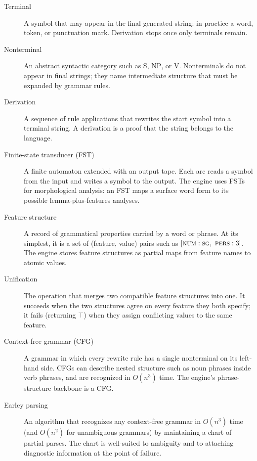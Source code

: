 \documentclass[11pt]{article}
\theoremstyle{definition}
\theoremstyle{plain}
\theoremstyle{remark}
\begin{document}
\begin{description}
  \item[Terminal] A symbol that may appear in the final generated string: in
  practice a word, token, or punctuation mark. Derivation stops once only
  terminals remain.

  \item[Nonterminal] An abstract syntactic category such as \textsc{S},
  \textsc{NP}, or \textsc{V}. Nonterminals do not appear in final strings;
  they name intermediate structure that must be expanded by grammar rules.

  \item[Derivation] A sequence of rule applications that rewrites the start
  symbol into a terminal string. A derivation is a proof that the string belongs
  to the language.

  \item[Finite-state transducer (FST)] A finite automaton extended with an
  output tape. Each arc reads a symbol from the input and writes a symbol to the
  output. The engine uses FSTs for morphological analysis: an FST maps a surface
  word form to its possible lemma-plus-features analyses.

  \item[Feature structure] A record of grammatical properties carried by a word or
  phrase. At its simplest, it is a set of (feature, value) pairs such as
  $[\textsc{num}:\textsc{sg},\ \textsc{pers}:3]$. The engine stores feature
  structures as partial maps from feature names to atomic values.

  \item[Unification] The operation that merges two compatible feature structures
  into one. It succeeds when the two structures agree on every feature they both
  specify; it fails (returning $\top$) when they assign conflicting values to the
  same feature.

  \item[Context-free grammar (CFG)] A grammar in which every rewrite rule has a
  single nonterminal on its left-hand side. CFGs can describe nested structure
  such as noun phrases inside verb phrases, and are recognized in $O(n^3)$ time.
  The engine's phrase-structure backbone is a CFG.

  \item[Earley parsing] An algorithm that recognizes any context-free grammar in
  $O(n^3)$ time (and $O(n^2)$ for unambiguous grammars) by maintaining a chart of
  partial parses. The chart is well-suited to ambiguity and to attaching
  diagnostic information at the point of failure.


\end{description}
\end{document}
